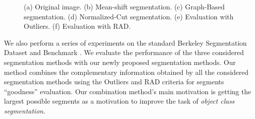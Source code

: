 \documentclass{llncs}
\begin{document}
\begin{figure}[!t]
{    \label{fig:nc}
}
\caption{(a) Original image.
(b) Mean-shift segmentation.
(c) Graph-Based segmentation.
(d) Normalized-Cut segmentation.
(e) Evaluation with Outliers.
(f) Evaluation with RAD.}
\label{fig:mix_allsegs}
\end{figure}

We also perform a series of experiments on the standard Berkeley Segmentation Dataset and
Benchmark \cite{MartinFTM01}. We evaluate the performance of the three considered segmentation methods with
our newly proposed segmentation methods. Our method combines the complementary information obtained by all the
considered segmentation methods using the Outliers and RAD criteria for segments ``goodness'' evaluation. Our combination
method's main motivation is getting the largest possible segments as a motivation to improve the task of \textit{object
class segmentation}.
\end{document}
